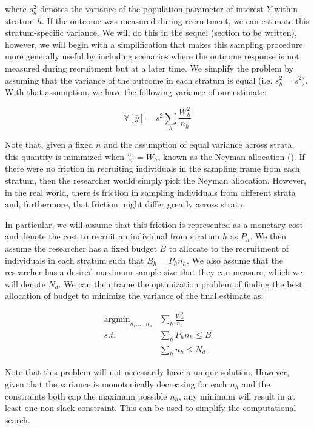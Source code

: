 \documentclass[a4paper,12pt]{article}
\theoremstyle{proposition}
\DeclareMathOperator*{\argmin}{argmin}
\begin{document}
where $s_h^2$ denotes the variance of the population parameter of interest $Y$ within stratum $h$. If the outcome was measured during recruitment, we can estimate this stratum-specific variance. We will do this in the sequel (section to be written), however, we will begin with a simplification that makes this sampling procedure more generally useful by including scenarios where the outcome response is not measured during recruitment but at a later time. We simplify the problem by assuming that the variance of the outcome in each stratum is equal (i.e. $s_h^2 = s^2$). With that assumption, we have the following variance of our estimate:

$$
\mathbb{V}[\bar{y}] =  s^2  \sum_{h}  \frac{W_h^2}{n_h}
$$

Note that, given a fixed $n$ and the assumption of equal variance across strata, this quantity is minimized when $\frac{n_h}{n} = W_h$, known as the Neyman allocation (\cite{Neyman1934,Groves2010}). If there were no friction in recruiting individuals in the sampling frame from each stratum, then the researcher would simply pick the Neyman allocation. However, in the real world, there is friction in sampling individuals from different strata and, furthermore, that friction might differ greatly across strata.

In particular, we will assume that this friction is represented as a monetary cost and denote the cost to recruit an individual from stratum $h$ as $P_h$. We then assume the researcher has a fixed budget $B$ to allocate to the recruitment of individuals in each stratum such that $B_h = P_hn_h$. We also assume that the researcher has a desired maximum sample size that they can measure, which we will denote $N_d$. We can then frame the optimization problem of finding the best allocation of budget to minimize the variance of the final estimate as:


\begin{align*}
\argmin_{n_i,...,n_h}  &\sum_{h}  \frac{W_h^2}{n_h} \\
s.t. &\sum_h P_hn_h \leq B \\
     &\sum_h n_h \leq N_d
\end{align*}


Note that this problem will not necessarily have a unique solution. However, given that the variance is monotonically decreasing for each $n_h$ and the constraints both cap the maximum possible $n_h$, any minimum will result in at least one non-slack constraint. This can be used to simplify the computational search.
\end{document}
